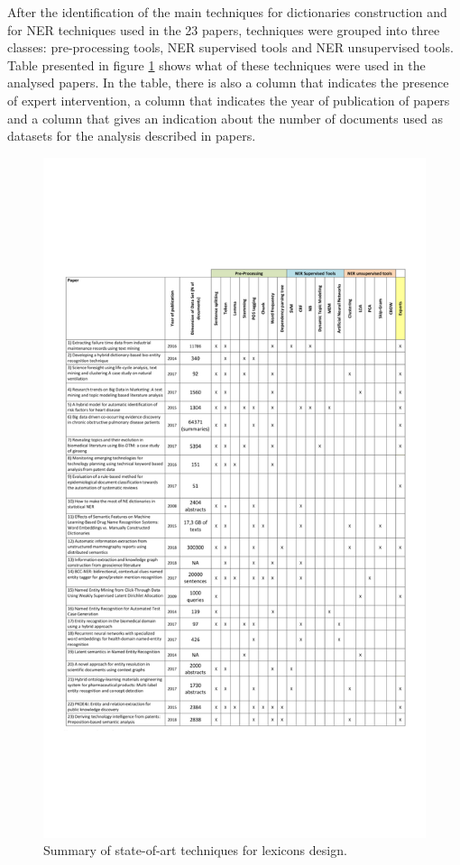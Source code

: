 \documentclass[]{book}
\theoremstyle{definition}
\theoremstyle{definition}
\theoremstyle{definition}
\theoremstyle{remark}
\begin{document}
After the identification of the main techniques for dictionaries
construction and for NER techniques used in the 23 papers, techniques
were grouped into three classes: pre-processing tools, NER supervised
tools and NER unsupervised tools. Table presented in figure
\ref{fig:lexdesign} shows what of these techniques were used in the
analysed papers. In the table, there is also a column that indicates the
presence of expert intervention, a column that indicates the year of
publication of papers and a column that gives an indication about the
number of documents used as datasets for the analysis described in
papers.

\begin{figure}

{\centering \includegraphics[width=0.8\linewidth]{_bookdown_files/figures/final_lexicon} 

}

\caption{Summary of state-of-art techniques for lexicons design.}\label{fig:lexdesign}
\end{figure}
\end{document}
